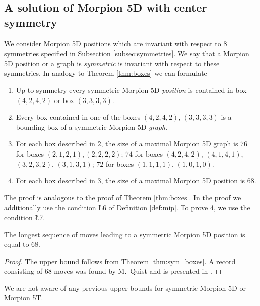 \subsection{A solution of Morpion 5D with center symmetry}
We consider Morpion 5D positions which are invariant with respect to $8$ symmetries 
specified in Subsection \ref{subsec:symmetries}. We say that a Morpion 5D position or a graph is {\em symmetric} is invariant with respect to these symmetries.  
In analogy to Theorem \ref{thm:boxes} we can formulate 
\begin{theorem}
\begin{enumerate}
\item Up to symmetry every symmetric Morpion 5D {\em position} is contained in box
$(4, 2, 4, 2)$ or box $(3, 3, 3, 3)$.
\item Every box contained in one of the boxes $(4, 2, 4, 2)$, $(3, 3, 3, 3)$ is a bounding box of a symmetric Morpion 5D {\em graph}.
\item For each box described in $2$, the size of a maximal Morpion 5D graph is $76$ for boxes $(2, 1, 2, 1), (2, 2, 2, 2)$; $74$ for boxes $(4,2,4,2)$, $(4,1,4,1)$, $(3,2,3,2)$, $(3,1,3,1)$; $72$ for boxes $(1,1,1,1)$, $(1,0,1,0)$.
\item For each box described in $3$, the size of a maximal Morpion 5D position is $68$.
\end{enumerate} 
\label{thm:sym_boxes}
\end{theorem}

The proof is analogous to the proof of Theorem \ref{thm:boxes}. In the proof we additionally use the condition \L{6} of Definition \ref{def:mip}. To prove 4, we use the condition \L{7}.

\begin{corollary}
\label{cor:68}
The longest sequence of moves leading to a symmetric Morpion 5D position is equal to $68$.
\end{corollary}
\begin{proof} 
The upper bound follows from Theorem \ref{thm:sym_boxes}.
A record consisting of $68$ moves was found by M.~Quist and is presented in \cite{boyer}. %
\end{proof}

We are not aware of any previous upper bounds for symmetric Morpion 5D or Morpion 5T.

